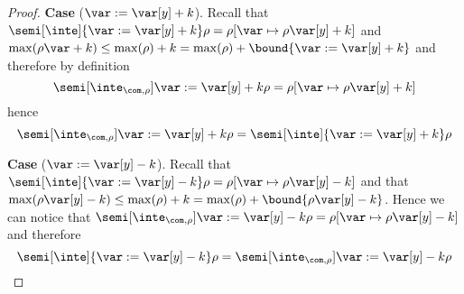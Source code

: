 \begin{proof}
  \medskip

  \noindent
  \textbf{Case} (\(\var := \var[y] + k\)).
  Recall that
  \({\semi[\inte]{\var := \var[y] + k}\rho} = {\rho[\var \mapsto
    \rho\var[y] + k]}\) and
  \({\max(\rho\var + k)} \leq {\max(\rho) + k} = {\max(\rho) +
    \bound{\var := \var[y] + k}}\)
  and therefore by definition
  \begin{equation*}
    \semi[\inte_{\com,\rho}]{\var := \var[y] + k}\rho = \rho[\var \mapsto \rho\var[y] + k]
  \end{equation*}
  hence
  \begin{equation*}
    \semi[\inte_{\com,\rho}]{\var := \var[y] + k}\rho = \semi[\inte]{\var := \var[y] + k}\rho
  \end{equation*}

  \medskip

  \noindent
  \textbf{Case} (\(\var := \var[y] - k\)).
  Recall that
  \({\semi[\inte]{\var := \var[y] - k}\rho} = {\rho[\var \mapsto
    \rho\var[y] - k]}\) and that
  \({\max(\rho\var[y] - k)} \leq {\max(\rho) + k} = {\max(\rho) +
    \bound{\rho\var[y] - k}}\). Hence we can notice that
  \({\semi[\inte_{\com,\rho}]{\var := \var[y] - k}\rho} = {\rho[\var
    \mapsto \rho\var[y] - k]}\) and therefore
  \begin{equation*}
    \semi[\inte]{\var := \var[y] - k}\rho = \semi[\inte_{\com,\rho}]{\var := \var[y] - k}\rho
  \end{equation*}

  \medskip


\end{proof}
